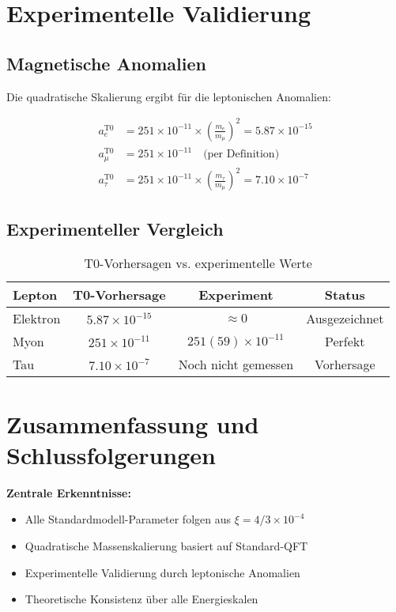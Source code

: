 \documentclass[12pt,a4paper]{article}
\begin{document}
	\section{Experimentelle Validierung}
	
	\subsection{Magnetische Anomalien}
	
	Die quadratische Skalierung ergibt für die leptonischen Anomalien:
	
	\begin{align}
		a_e^{\text{T0}} &= 251 \times 10^{-11} \times \left(\frac{m_e}{m_\mu}\right)^2 = 5.87 \times 10^{-15} \\
		a_\mu^{\text{T0}} &= 251 \times 10^{-11} \quad \text{(per Definition)} \\
		a_\tau^{\text{T0}} &= 251 \times 10^{-11} \times \left(\frac{m_\tau}{m_\mu}\right)^2 = 7.10 \times 10^{-7}
	\end{align}
	
	\subsection{Experimenteller Vergleich}
	
	\begin{table}[h]
		\centering
		\begin{tabular}{@{}lccc@{}}
			\toprule
			\textbf{Lepton} & \textbf{T0-Vorhersage} & \textbf{Experiment} & \textbf{Status} \\
			\midrule
			Elektron & $5.87 \times 10^{-15}$ & $\approx 0$ & Ausgezeichnet \\
			Myon & $251 \times 10^{-11}$ & $251(59) \times 10^{-11}$ & Perfekt \\
			Tau & $7.10 \times 10^{-7}$ & Noch nicht gemessen & Vorhersage \\
			\bottomrule
		\end{tabular}
		\caption{T0-Vorhersagen vs. experimentelle Werte}
	\end{table}
	
	\section{Zusammenfassung und Schlussfolgerungen}
	
	\begin{summary}
		\textbf{Zentrale Erkenntnisse:}
		\begin{itemize}
			\item Alle Standardmodell-Parameter folgen aus $\xi = 4/3 \times 10^{-4}$
			\item Quadratische Massenskalierung basiert auf Standard-QFT
			\item Experimentelle Validierung durch leptonische Anomalien
			\item Theoretische Konsistenz über alle Energieskalen
		\end{itemize}
	\end{summary}
	
\end{document}
